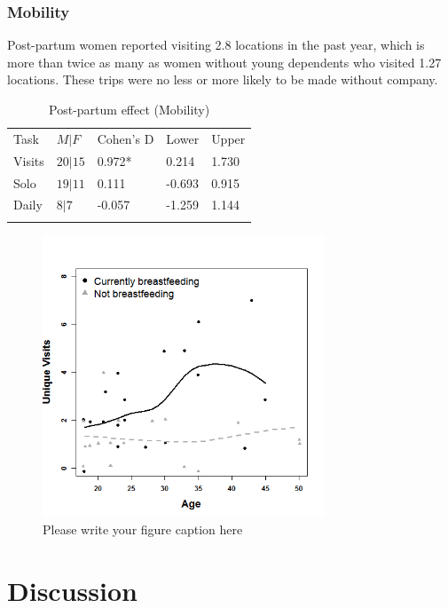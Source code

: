 		\subsubsection{Mobility}
		\label{sec:3.3.3}
Post-partum women reported visiting 2.8 locations in the past year, which is more than twice as many as women without young dependents who visited 1.27 locations.  These trips were no less or more likely to be made without company.

\begin{table}[h!]
\caption{Post-partum effect (Mobility)}
\label{tab:bf_mob}  
\begin{tabular}{lllll}
\hline\noalign{\smallskip}
Task & $M|F$ & Cohen's D & Lower & Upper  \\
\noalign{\smallskip}\hline\noalign{\smallskip}
Visits & $20|15$ & \phantom{-}0.972* & \phantom{-}0.214 & \phantom{-}1.730 \\
Solo & $19|11$ & \phantom{-}0.111 & -0.693 & \phantom{-}0.915\\
Daily & $8|7$ & -0.057 & -1.259 & \phantom{-}1.144 \\
\noalign{\smallskip}\hline
\end{tabular}
\end{table}
		
\begin{figure}[!htb]
  \includegraphics[width=0.75\textwidth]{bfeed_tot}
\caption{Please write your figure caption here}
\label{fig:1}       %
\end{figure}

\section{Discussion}
\label{sec:4}


